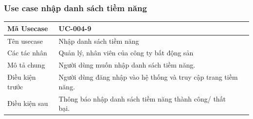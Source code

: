 \documentclass[12pt,a4paper]{article}
\begin{document}
    \subsubsection*{Use case nhập danh sách tiềm năng}
    \begin{table}[H]
        \centering
        \begin{tabular}{|p{3.5cm}|p{11.5cm}|c|}
            \hline
            Mã Usecase      & UC-004-9                                                       \\
            \hline
            Tên usecase     & Nhập danh sách tiềm năng                                       \\
            \hline
            Các tác nhân    & Quản lý, nhân viên của công ty bất động sản                    \\
            \hline
            Mô tả chung     & Người dùng muốn nhập danh sách tiềm năng.                      \\
            \hline

            Điều kiện trước & Người dùng đăng nhập vào hệ thống và truy cập trang tiềm năng. \\
            \hline

            Điều kiện sau   & Thông báo nhập danh sách tiềm năng thành công/ thất bại.       \\
            \hline


\end{tabular}
\end{table}
\end{document}
